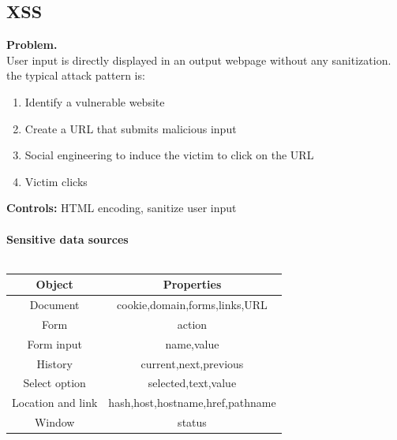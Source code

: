\documentclass[10pt,a4paper]{article}
\begin{document}
\subsection{XSS}
\textbf{Problem.} \\
User input is directly displayed in an output webpage without any sanitization. the typical attack pattern is:
\begin{enumerate}
\item Identify a vulnerable website
\item Create a URL that submits malicious input
\item Social engineering to induce the victim to click on the URL
\item Victim clicks
\end{enumerate}
\textbf{Controls:} HTML encoding, sanitize user input\\\\
\textbf{Sensitive data sources}\\\\
\begin{tabular}{|c|c|}
\hline 
{\bf Object} & {\bf Properties} \\ 
\hline 
Document & cookie,domain,forms,links,URL \\ 
\hline 
Form & action \\ 
\hline 
Form input & name,value \\ 
\hline 
History & current,next,previous \\ 
\hline 
Select option & selected,text,value \\ 
\hline 
Location and link & hash,host,hostname,href,pathname\\ 
\hline 
Window & status \\ 
\hline 
\end{tabular} 
\end{document}
